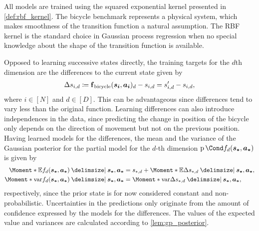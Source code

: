 All models are trained using the squared exponential kernel presented in \cref{def:rbf_kernel}.
The bicycle benchmark represents a physical system, which makes smoothness of the transition function a natural assumption.
The RBF kernel is the standard choice in Gaussian process regression when no special knowledge about the shape of the transition function is available.

Opposed to learning successive states directly, the training targets for the $d$th dimension are the differences to the current state given by
\begin{align}
    \Delta s_{i,d} \coloneqq \operatorname{\operatorname{\mathbf{f}}_{\text{bicycle}}}(\bm{s_i}, \bm{a_i})_d - s_{i,d} = s_{i,d }^\prime - s_{i,d},
\end{align}
where $i \in [N]$ and $d \in [D]$.
This can be advantageous since differences tend to vary less than the original function.
Learning differences can also introduce independences in the data, since predicting the change in position of the bicycle only depends on the direction of movement but not on the previous position.
Having learned models for the differences, the mean and the variance of the Gaussian posterior for the partial model for the $d$-th dimension $\Prob{f_d(\mat{s_\ast}, \mat{a_\ast})}$ is given by
\begin{align}
    \Moment*{\E}{f_d(\mat{s_\ast}, \mat{a_\ast}) \given \mat{s_\ast}, \mat{a_\ast}} &= s_{\ast,d} + \Moment*{\E}{\Delta s_{\ast,d} \given \mat{s_\ast}, \mat{a_\ast}}, \\
    \Moment*{\var}{f_d(\mat{s_\ast}, \mat{a_\ast}) \given \mat{s_\ast}, \mat{a_\ast}} &= \Moment*{\var}{\Delta s_{\ast,d} \given \mat{s_\ast}, \mat{a_\ast}},
\end{align}
respectively, since the prior state is for now considered constant and non-probabilistic.
Uncertainties in the predictions only originate from the amount of confidence expressed by the models for the differences.
The values of the expected value and variances are calculated according to \cref{lem:gp_posterior}.

